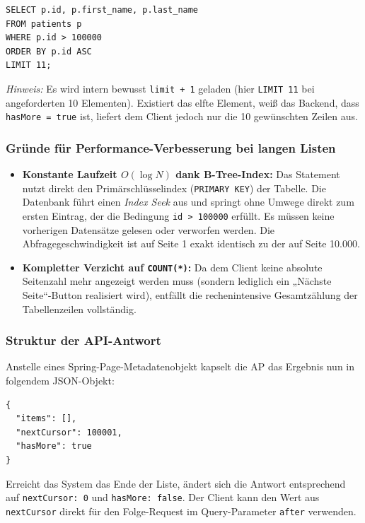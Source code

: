 \begin{lstlisting}[style=sqlstyle]
SELECT p.id, p.first_name, p.last_name 
FROM patients p 
WHERE p.id > 100000 
ORDER BY p.id ASC 
LIMIT 11;
\end{lstlisting}
\textit{Hinweis:} Es wird intern bewusst \texttt{limit + 1} geladen (hier \texttt{LIMIT 11} bei angeforderten 10 Elementen). Existiert das elfte Element, weiß das Backend, dass \texttt{hasMore = true} ist, liefert dem Client jedoch nur die 10 gewünschten Zeilen aus.

\subsubsection*{Gründe für Performance-Verbesserung bei langen Listen}
\begin{itemize}
    \item \textbf{Konstante Laufzeit $O(\log N)$ dank B-Tree-Index:} Das Statement nutzt direkt den Primärschlüsselindex (\texttt{PRIMARY KEY}) der Tabelle. Die Datenbank führt einen \textit{Index Seek} aus und springt ohne Umwege direkt zum ersten Eintrag, der die Bedingung \texttt{id > 100000} erfüllt. Es müssen keine vorherigen Datensätze gelesen oder verworfen werden. Die Abfragegeschwindigkeit ist auf Seite 1 exakt identisch zu der auf Seite 10.000.
    \item \textbf{Kompletter Verzicht auf \texttt{COUNT(*)}:} Da dem Client keine absolute Seitenzahl mehr angezeigt werden muss (sondern lediglich ein „Nächste Seite“-Button realisiert wird), entfällt die rechenintensive Gesamtzählung der Tabellenzeilen vollständig.
\end{itemize}


\subsubsection*{Struktur der API-Antwort}
Anstelle eines Spring-Page-Metadatenobjekt kapselt die AP das Ergebnis nun in folgendem JSON-Objekt:
\begin{lstlisting}[language={}]
{
  "items": [],
  "nextCursor": 100001,
  "hasMore": true
}
\end{lstlisting}

Erreicht das System das Ende der Liste, ändert sich die Antwort entsprechend auf \texttt{nextCursor: 0} und \texttt{hasMore: false}. 
Der Client kann den Wert aus \texttt{nextCursor} direkt für den Folge-Request im Query-Parameter \texttt{after} verwenden.


